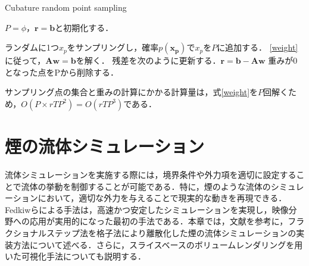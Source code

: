 \documentclass[a4j,12pt]{jreport}
\begin{document}
\begin{algorithm}[H]
    	\caption{Cubature random point sampling}
	\label{alg1}
        	\begin{algorithmic}[1]
		\STATE $P = \phi$，$\bm{r} = \bm{b}$と初期化する．                
		
			\STATE ランダムに1つ$x_p$をサンプリングし，確率$p(\bm{x_p})$で$x_p$を$P$に追加する．
			\STATE \ref{weight}に従って，$\bm{A}\bm{w} = \bm{b}$を解く．
			\STATE 残差を次のように更新する．$\bm{r} = \bm{b} - \bm{A}\bm{w}$
			\STATE 重みが0となった点をPから削除する．
		\ENDWHILE
        \end{algorithmic}
\end{algorithm}

サンプリング点の集合と重みの計算にかかる計算量は，式\ref{weight}を$P$回解くため，$O(P\times rTP^2) = O(rTP^3)$である．
\chapter{煙の流体シミュレーション}
流体シミュレーションを実施する際には，境界条件や外力項を適切に設定することで流体の挙動を制御することが可能である．特に，煙のような流体のシミュレーションにおいて，適切な外力を与えることで現実的な動きを再現できる．Fedkiwらによる手法\cite{fedkiw}は，高速かつ安定したシミュレーションを実現し，映像分野への応用が実用的になった最初の手法である．本章では，文献\cite{fedkiw}を参考に，フラクショナルステップ法を格子法により離散化した煙の流体シミュレーションの実装方法について述べる．さらに，スライスベースのボリュームレンダリングを用いた可視化手法についても説明する．%
\end{document}
